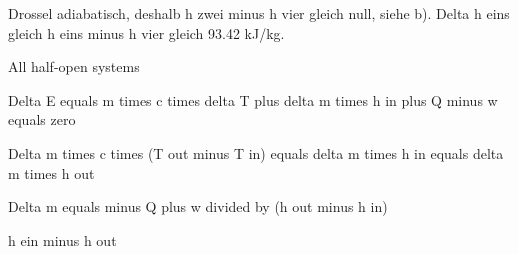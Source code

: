 Drossel adiabatisch, deshalb h zwei minus h vier gleich null, siehe b). Delta h eins gleich h eins minus h vier gleich 93.42 kJ/kg.

All half-open systems

Delta E equals m times c times delta T plus delta m times h in plus Q minus w equals zero

Delta m times c times (T out minus T in) equals delta m times h in equals delta m times h out

Delta m equals minus Q plus w divided by (h out minus h in)

h ein minus h out